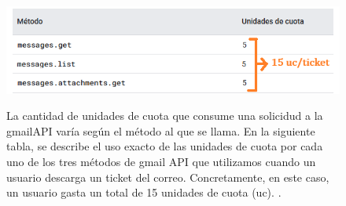 \documentclass[a4paper,12pt]{report}
\begin{document}
	
	\FloatBarrier
	\setlength{\belowcaptionskip}{3pt}
	\begin{figure}[H]
		\centering
		\caption{La cantidad de unidades de cuota que consume una solicidud a la gmailAPI varía según el método al que se llama. En la siguiente tabla, se describe el uso exacto de las unidades de cuota por cada uno de los tres métodos de gmail API que utilizamos cuando un usuario descarga un ticket del correo. Concretamente, en este caso, un usuario gasta un total de 15 unidades de cuota (uc). \cite{gmail_api_quota}.}
		\includegraphics[width=1\linewidth]{img/quotesGoogleDevelopersUSADES}
		\label{fig:quotesGoogleDevelopersUSADES}
	\end{figure}
	\FloatBarrier
		
		
		
	
	

	
	
\end{document}
